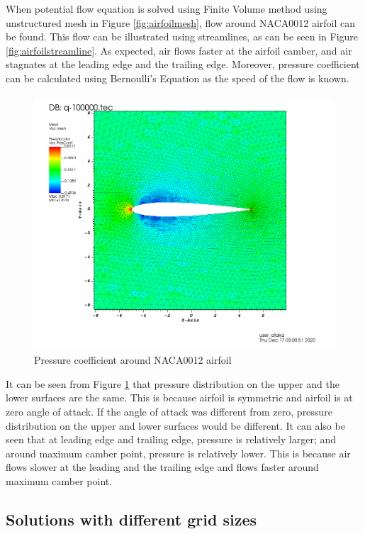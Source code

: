 \documentclass[letterpaper,12pt]{article}
\begin{document}
When potential flow equation is solved using Finite Volume method using unstructured mesh in Figure \ref{fig:airfoilmesh},
flow around NACA0012 airfoil can be found. This flow can be illustrated using streamlines, as can be seen in 
Figure \ref{fig:airfoilstreamline}. As expected, air flows faster at the airfoil camber, and air stagnates at the 
leading edge and the trailing edge. Moreover, pressure coefficient can be calculated using Bernoulli's Equation 
as the speed of the flow is known.

\newpage

\begin{figure} [!h]
	\centering
	\includegraphics[height = 9.5cm]{graph/medium/medium_pressure0000.png}
	\caption{Pressure coefficient around NACA0012 airfoil}
    \label{fig:airfoilpressure}
\end{figure}

It can be seen from Figure \ref{fig:airfoilpressure} that pressure distribution on the upper and the lower surfaces are the same.
This is because airfoil is symmetric and airfoil is at zero angle of attack. If the angle of attack was different from zero, 
pressure distribution on the upper and lower surfaces would be different. It can also be seen that at leading edge and trailing edge,
pressure is relatively larger; and around maximum camber point, pressure is relatively lower. This is because air flows slower at the 
leading and the trailing edge and flows faster around maximum camber point.

\newpage

\subsection{Solutions with different grid sizes}
\end{document}
